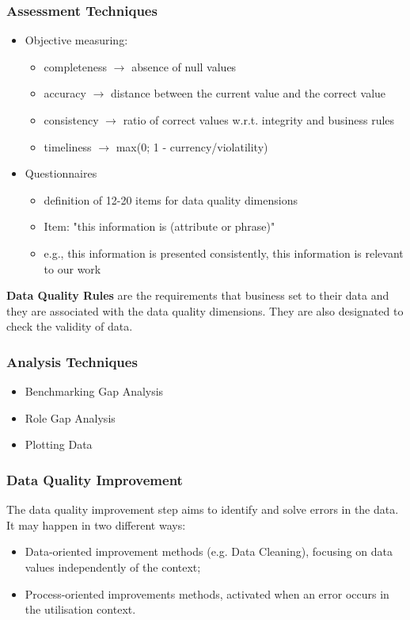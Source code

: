 \documentclass[10pt,a4paper]{article}
\begin{document}
\begin{justify}
\subsubsection{Assessment Techniques}
\begin{itemize}
	\item Objective measuring: 
	\begin{itemize}
		\item completeness $\rightarrow$ absence of null values
		\item accuracy $\rightarrow$ distance between the current value and the correct value
		\item consistency $\rightarrow$ ratio of correct values w.r.t. integrity and business rules
		\item timeliness $\rightarrow$ max(0; 1 - currency/violatility)
\end{itemize}		
	\item Questionnaires
	\begin{itemize}
		\item definition of 12-20 items for data quality dimensions
		\item Item: "this information is (attribute or phrase)"
		\item e.g., this information is presented consistently, this information is relevant to our work
	\end{itemize}
\end{itemize}
\textbf{Data Quality Rules} are the requirements that business set to their data and they are associated with the data quality dimensions. They are also designated to check the validity of data.
\subsubsection{Analysis Techniques}
\begin{itemize}
	\item Benchmarking Gap Analysis
	\item Role Gap Analysis
	\item Plotting Data
\end{itemize}
\subsubsection{Data Quality Improvement}
The data quality improvement step aims to identify and solve errors in the data. It may happen in two different ways:
\begin{itemize}
	\item Data-oriented improvement methods (e.g. Data Cleaning), focusing on data values independently of the context;
	\item Process-oriented improvements methods, activated when an error occurs in the utilisation context.
\end{itemize}


\end{justify}
\end{document}
